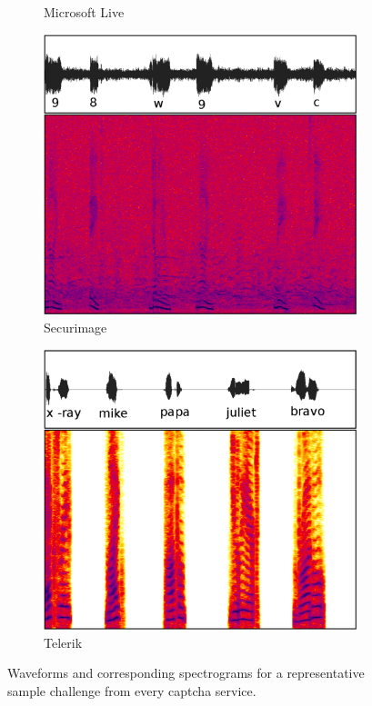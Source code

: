 \begin{figure}[tp]
\begin{subfigure}{0.3\textwidth}
        \caption{Microsoft Live}
        \label{fig:live}
\end{subfigure}\hspace{0.03\textwidth} 
\begin{subfigure}{0.3\textwidth}
        \includegraphics[width=\textwidth]{figures/secure.pdf}
        \caption{Securimage}
        \label{fig:secure}
\end{subfigure}\hspace{0.03\textwidth}
\begin{subfigure}{0.3\textwidth}
        \includegraphics[width=\textwidth]{figures/telerik.pdf}
        \caption{Telerik}
        \label{fig:telerik}
\end{subfigure}
\caption{Waveforms and corresponding spectrograms for a representative sample challenge from every captcha service.}
\label{fig:examples}
\end{figure}

